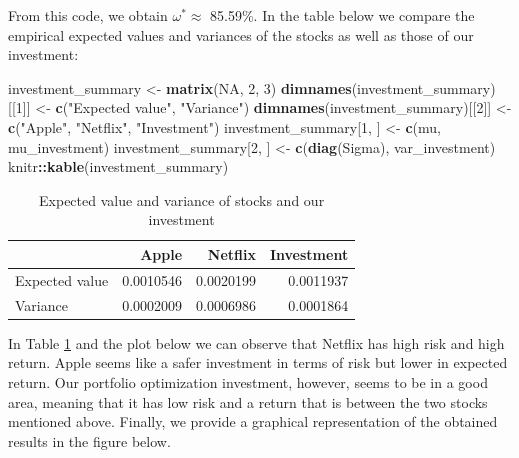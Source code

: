\documentclass[12pt,]{krantz}
\newenvironment{Shaded}{\begin{snugshade}}{\end{snugshade}}
\newcommand{\KeywordTok}[1]{\textcolor[rgb]{0.27,0.27,0.27}{\textbf{#1}}}
\newcommand{\DecValTok}[1]{\textcolor[rgb]{0.06,0.06,0.06}{#1}}
\newcommand{\StringTok}[1]{\textcolor[rgb]{0.5,0.5,0.5}{#1}}
\newcommand{\OtherTok}[1]{\textcolor[rgb]{0.37,0.37,0.37}{#1}}
\newcommand{\OperatorTok}[1]{\textcolor[rgb]{0.43,0.43,0.43}{\textbf{#1}}}
\newcommand{\NormalTok}[1]{#1}
\begin{document}
From this code, we obtain \(\omega^* \approx\) 85.59\%. In the table
below we compare the empirical expected values and variances of the
stocks as well as those of our investment:

\begin{Shaded}
\begin{Highlighting}[]
\NormalTok{investment_summary <-}\StringTok{ }\KeywordTok{matrix}\NormalTok{(}\OtherTok{NA}\NormalTok{, }\DecValTok{2}\NormalTok{, }\DecValTok{3}\NormalTok{)}
\KeywordTok{dimnames}\NormalTok{(investment_summary)[[}\DecValTok{1}\NormalTok{]] <-}\StringTok{ }\KeywordTok{c}\NormalTok{(}\StringTok{"Expected value"}\NormalTok{, }\StringTok{"Variance"}\NormalTok{)}
\KeywordTok{dimnames}\NormalTok{(investment_summary)[[}\DecValTok{2}\NormalTok{]] <-}\StringTok{ }\KeywordTok{c}\NormalTok{(}\StringTok{"Apple"}\NormalTok{, }\StringTok{"Netflix"}\NormalTok{, }\StringTok{"Investment"}\NormalTok{)}
\NormalTok{investment_summary[}\DecValTok{1}\NormalTok{, ] <-}\StringTok{ }\KeywordTok{c}\NormalTok{(mu, mu_investment)}
\NormalTok{investment_summary[}\DecValTok{2}\NormalTok{, ] <-}\StringTok{ }\KeywordTok{c}\NormalTok{(}\KeywordTok{diag}\NormalTok{(Sigma), var_investment)}
\NormalTok{knitr}\OperatorTok{::}\KeywordTok{kable}\NormalTok{(investment_summary)}
\end{Highlighting}
\end{Shaded}

\begin{table}

\caption{\label{tab:tableprtexample}Expected value and variance of stocks and our investment}
\centering
\begin{tabular}[t]{l|r|r|r}
\hline
  & Apple & Netflix & Investment\\
\hline
Expected value & 0.0010546 & 0.0020199 & 0.0011937\\
\hline
Variance & 0.0002009 & 0.0006986 & 0.0001864\\
\hline
\end{tabular}
\end{table}

In Table \ref{tab:tableprtexample} and the plot below we can observe
that Netflix has high risk and high return. Apple seems like a safer
investment in terms of risk but lower in expected return. Our portfolio
optimization investment, however, seems to be in a good area, meaning
that it has low risk and a return that is between the two stocks
mentioned above. Finally, we provide a graphical representation of the
obtained results in the figure below.
\end{document}
